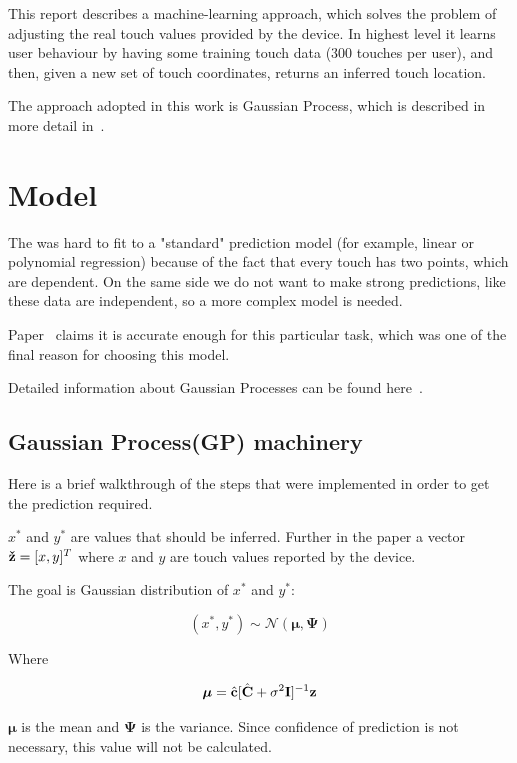 \documentclass[english,11pt]{article}
\numberwithin{equation}{section}
\begin{document}
This report describes a machine-learning approach, which solves the problem of
adjusting the real touch values provided by the device. In highest level it
learns user behaviour by having some training touch data (300 touches per user),
and then, given a new set of touch coordinates, returns an inferred touch
location.

The approach adopted in this work is Gaussian Process, which is described in
more detail in~\cite{WeiRogMur}.

\section{Model}

The was hard to fit to a "standard" prediction model (for example, linear
or polynomial regression) because of the fact that every touch has two points,
which are dependent. On the same side we do not want to make strong predictions,
like these data are independent, so a more complex model is needed.

Paper~\cite{WeiRogMur} claims it is accurate enough for this particular task,
which was one of the final reason for choosing this model.

Detailed information about Gaussian Processes can be found here~\cite{GP}.

\subsection{Gaussian Process(GP) machinery}

\newcommand{\z}{\textrm{\bf{\v{z}}}}
\newcommand{\zn}{\textrm{\bf{\v{z}$_n$}}}
\newcommand{\zm}{\textrm{\bf{\v{z}$_m$}}}

Here is a brief walkthrough of the steps that were implemented in order to get
the prediction required.

$x^*$ and $y^*$ are values that should be inferred. Further in the paper a
vector $\z = [x, y]^T$ where $x$ and $y$ are touch values reported by the
device.

The goal is Gaussian
distribution of $x^*$ and $y^*$:

$$ (x^*, y^*) \sim \mathcal{N}(\bm{\mu}, \bm{\Psi}) $$

Where

$$ \bm{\mu} = \hat{\textrm{\bf{c}}} [ \hat{\textrm{\bf{C}}} +
    \sigma^2 \textrm{\bf{I}} ]^{-1} \textrm{\bf{z}}
$$

$\bm{\mu}$ is the mean and $\bm{\Psi}$ is the variance. Since confidence of
prediction is not necessary, this value will not be calculated.
\end{document}

